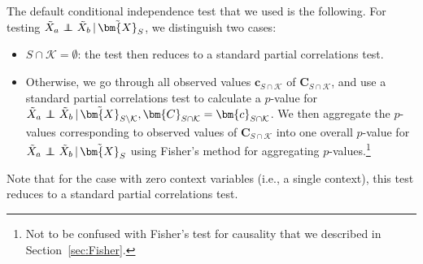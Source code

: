 \documentclass[twoside,11pt]{article}
\DeclareMathOperator*{\CI}{{\,\perp\mkern-12mu\perp\,}}
\newcommand\B[1]{\bm{#1}}
\newcommand\C[1]{\mathcal{#1}}
\newcommand\given{\,|\,}
\begin{document}
The default conditional independence test that we used is the following. For testing $\tilde{X}_a \CI \tilde{X}_b \given \tilde{\B{X}}_S$, we distinguish two cases:
\begin{itemize}
  \item $S \cap \C{K} = \emptyset$: the test then reduces to a standard partial correlations test.
  \item Otherwise, we go through all observed values $\B{c}_{S \cap \C{K}}$ of $\B{C}_{S \cap \C{K}}$, 
    and use a standard partial correlations test
    to calculate a $p$-value for $\tilde{X}_a \CI \tilde{X}_b \given \tilde{\B{X}}_{S\setminus\C{K}}, \B{C}_{S \cap \C{K}}=\B{c}_{S \cap \C{K}}$. We then aggregate the
    $p$-values corresponding to observed values of $\B{C}_{S \cap \C{K}}$ into one overall $p$-value for $\tilde{X}_a \CI \tilde{X}_b \given \tilde{\B{X}}_S$ using
    Fisher's method for aggregating $p$-values.\footnote{Not to be confused with Fisher's test for causality that we
    described in Section~\ref{sec:Fisher}.}
\end{itemize}
Note that for the case with zero context variables (i.e., a
single context), this test reduces to a standard partial correlations test. 

\end{document}
